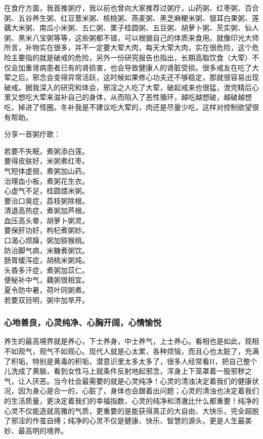 在食疗方面，我首推粥疗，我以前也曾向大家推荐过粥疗，山药粥、红枣粥、百合粥、五谷养生粥、红豆薏米粥、核桃粥、燕麦粥、黑芝麻粳米粥、银耳白果粥、莲藕大米粥、南瓜小米粥、五仁粥、栗子桂圆粥、五豆粥、胡萝卜粥、芡实粥、仙人粥、黑米八宝粥等等，这些粥都不错，可以根据自己的体质来食用。就像印光大师所言，补物实在很多，并不一定要大荤大肉，每天大荤大肉，实在很危险，这个危险主要指的就是破戒的危险，另外一份研究报告也指出，长期高脂饮食（大荤）不仅会加重肾病患者已有的肾损害，也会导致健康人的肾脏受损。很多戒友在吃了大荤之后，邪念会变得异常活跃，这时候如果修心功夫还不够稳定，那就很容易出现破戒。据我深入的研究和体会，邪淫之人吃了大荤，破起戒来也很猛，泄完精后心里又想吃大荤来滋补自己的身体，从而陷入了恶性循环，越吃越想破，越破越想吃，掉进了怪圈。冬补我是不建议吃大荤的，肉还是尽量少吃，这样对控制欲望很有帮助。

分享一首粥疗歌：

\begin{multicols}{2}
    \begin{center}
        若要不失眠，煮粥添白莲。 \\ 要得皮肤好，米粥煮红枣。 \\ 气短体虚弱，煮粥加山药。 \\ 治理血小板，煮粥花生衣。 \\ 心虚气不足，桂圆煨米粥。 \\ 要治口臭症，荔枝粥除根。 \\ 清退高热症，煮粥加芦根。 \\ 血压高头晕，胡萝卜粥灵。 \\ 要保肝功好，枸杞煮粥妙。 \\ 口渴心烦躁，粥加猕猴桃。 \\ 防治脚气病，米糠煮粥饮。 \\ 肠胃缓泻症，胡桃米粥炖。 \\ 头昏多汗症，煮粥加苡仁。 \\ 便秘补中气，藕粥很相宜。 \\ 夏令防中暑，荷叶同粥煮。 \\ 若要双目明，粥中加旱芹。
    \end{center}
\end{multicols}

\subsubsection{心地善良，心灵纯净、心胸开阔，心情愉悦}

养生的最高境界就是养心，下士养身，中士养气，上士养心。看相也是如此，观相不如观气，观气不如观心。现代人就是心太累，各种烦恼，而且心也太脏了，充满了积垢，特别是黄毒的积垢，潜意识里太多太多了，很多人经常看H，把自己整个儿洗成了黄脑，看到女性马上就条件反射地起邪念，浑身上下笼罩着一股邪秽之气，让人厌恶。当今社会最需要的就是心灵纯净！心灵的清浊决定着我们的健康状况，因为身心是合一的，心脏了，身体也会跟着出问题；心灵的清浊也决定着我们的生活质量，更决定着我们的幸福指数，心灵的纯净和清澈比什么都重要！纯净的心灵不仅能造就高雅的气质，更重要的是能获得真正的大自由、大快乐，完全超脱了邪淫的作茧自缚；纯净的心灵不仅是健康、快乐、智慧的源头，更是人生最美妙、最高明的境界。


